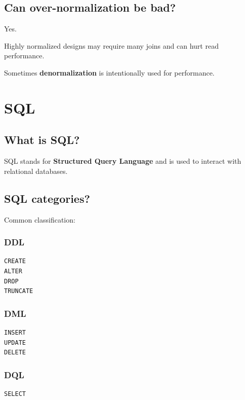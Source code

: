 \medskip

\subsection{Can over-normalization be bad?}

Yes.

Highly normalized designs may require many joins and can hurt read performance.

Sometimes \textbf{denormalization} is intentionally used for performance.

\medskip

\section{SQL}

\subsection{What is SQL?}

SQL stands for \textbf{Structured Query Language} and is used to interact with relational databases.

\medskip

\subsection{SQL categories?}

Common classification:

\subsubsection{DDL}

\begin{lstlisting}
CREATE
ALTER
DROP
TRUNCATE
\end{lstlisting}

\subsubsection{DML}

\begin{lstlisting}
INSERT
UPDATE
DELETE
\end{lstlisting}

\subsubsection{DQL}

\begin{lstlisting}
SELECT
\end{lstlisting}

